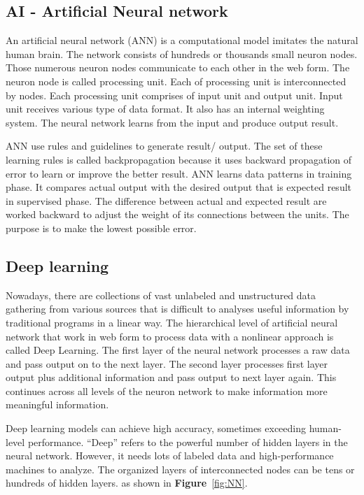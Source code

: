 \documentclass[12pt,oneside,openright,a4paper]{cpe-english-project}
\begin{document}
\subsection{AI - Artificial Neural network}
An artificial neural network (ANN) is a computational model imitates the natural human brain. The network consists of hundreds or thousands small neuron nodes. Those numerous neuron nodes communicate to each other in the web form. The neuron node is called processing unit. Each of processing unit is interconnected by nodes. Each processing unit comprises of input unit and output unit. Input unit receives various type of data format. It also has an internal weighting system. The neural network learns from the input and produce output result.

ANN use rules and guidelines to generate result/ output. The set of these learning rules is called backpropagation because it uses backward propagation of error to learn or improve the better result. ANN learns data patterns in training phase. It compares actual output with the desired output that is expected result in supervised phase. The difference between actual and expected result are worked backward to adjust the weight of its connections between the units. The purpose is to make the lowest possible error. \cite{ann}

\subsection{Deep learning}
Nowadays, there are collections of vast unlabeled and unstructured data gathering from various sources that is difficult to analyses useful information by traditional programs in a linear way.  The hierarchical level of artificial neural network that work in web form to process data with a nonlinear approach is called Deep Learning.  The first layer of the neural network processes a raw data and pass output on to the next layer. The second layer processes first layer output plus additional information and pass output to next layer again. This continues across all levels of the neuron network to make information more meaningful information. \cite{deepLearning}

Deep learning models can achieve high accuracy, sometimes exceeding human-level performance. “Deep” refers to the powerful number of hidden layers in the neural network.  However, it needs lots of labeled data and high-performance machines to analyze. The organized layers of interconnected nodes can be tens or hundreds of hidden layers. \cite{deepLearning2} as shown in \textbf{Figure}~\ref{fig:NN}.
\end{document}
